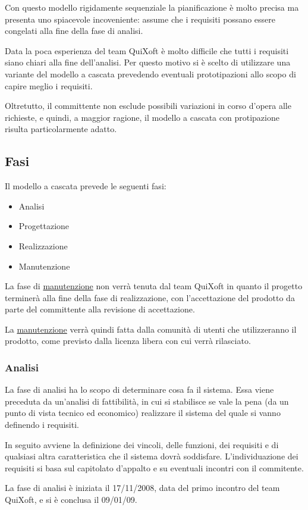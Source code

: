 \documentclass[11pt,a4paper]{article}
\begin{document}
Con questo modello rigidamente sequenziale la pianificazione è molto precisa ma presenta uno spiacevole incoveniente: assume che i requisiti possano essere congelati alla fine della fase di analisi.

Data la poca esperienza del team QuiXoft è molto difficile che tutti i requisiti siano chiari alla fine dell'analisi.
Per questo motivo si è scelto di utilizzare una variante del modello a cascata prevedendo eventuali prototipazioni allo scopo di capire meglio i requisiti.

Oltretutto, il committente non esclude possibili variazioni in corso d'opera alle richieste, e quindi, a maggior ragione, il modello a cascata con protipazione risulta particolarmente adatto.
\subsection{Fasi}
Il modello a cascata prevede le seguenti fasi:
\begin{itemize}
\item Analisi
\item Progettazione
\item Realizzazione
\item Manutenzione
\end{itemize}
\medskip
La fase di \underline{manutenzione} non verrà tenuta dal team QuiXoft in quanto il progetto terminerà alla fine della fase di realizzazione, con l'accettazione del prodotto da parte del committente alla revisione di accettazione.

La \underline{manutenzione} verrà quindi fatta dalla comunità di utenti che utilizzeranno il prodotto, come previsto dalla licenza libera con cui verrà rilasciato.
\subsubsection{Analisi}
La fase di analisi ha lo scopo di determinare cosa fa il sistema. Essa viene preceduta da un'analisi di fattibilità, in cui si stabilisce se vale la pena (da un punto di vista tecnico ed economico) realizzare il sistema del quale si vanno definendo i requisiti.

In seguito avviene la definizione dei vincoli, delle funzioni, dei requisiti e di qualsiasi altra caratteristica che il sistema dovrà soddisfare.
L'individuazione dei requisiti si basa sul capitolato d'appalto e su eventuali incontri con il commitente.

La fase di analisi è iniziata il 17/11/2008, data del primo incontro del team QuiXoft, e si è conclusa il 09/01/09.
\end{document}
